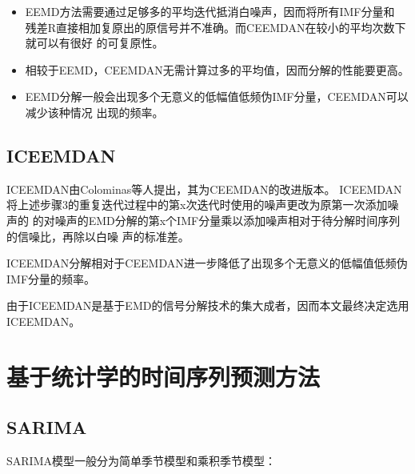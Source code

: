 \documentclass[AutoFakeBold]{LZUThesis}
\begin{document}
\begin{itemize}
\item EEMD方法需要通过足够多的平均迭代抵消白噪声，因而将所有IMF分量和
残差R直接相加复原出的原信号并不准确。而CEEMDAN在较小的平均次数下就可以有很好
的可复原性。
\item 相较于EEMD，CEEMDAN无需计算过多的平均值，因而分解的性能要更高。
\item EEMD分解一般会出现多个无意义的低幅值低频伪IMF分量，CEEMDAN可以减少该种情况
出现的频率。
\end{itemize}

\subsection{ICEEMDAN}

ICEEMDAN由Colominas等人提出\cite{colominas2014improved}，其为CEEMDAN的改进版本。
ICEEMDAN将上述步骤3的重复迭代过程中的第x次迭代时使用的噪声更改为原第一次添加噪声的
的对噪声的EMD分解的第x个IMF分量乘以添加噪声相对于待分解时间序列的信噪比，再除以白噪
声的标准差。

ICEEMDAN分解相对于CEEMDAN进一步降低了出现多个无意义的低幅值低频伪IMF分量的频率。

由于ICEEMDAN是基于EMD的信号分解技术的集大成者，因而本文最终决定选用ICEEMDAN。

\section{基于统计学的时间序列预测方法}
\subsection{SARIMA}
SARIMA模型一般分为简单季节模型和乘积季节模型：
\end{document}
